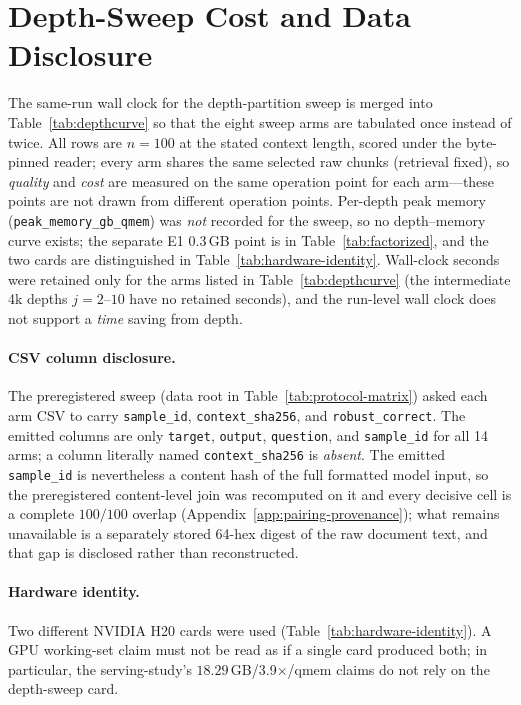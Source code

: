 \section{Depth-Sweep Cost and Data Disclosure}
\label{app:depthcurve-cost}

The same-run wall clock for the depth-partition sweep is merged into
Table~\ref{tab:depthcurve} so that the eight sweep arms are tabulated once
instead of twice.  All rows are $n=100$ at the stated context length, scored
under the byte-pinned reader; every arm shares the same selected raw chunks
(retrieval fixed), so \emph{quality} and \emph{cost} are measured on the same
operation point for each arm---these points are not drawn from different
operation points.  Per-depth peak memory (\texttt{peak\_memory\_gb\_qmem}) was
\emph{not} recorded for the sweep, so no depth--memory curve exists; the
separate E1 0.3\,GB point is in Table~\ref{tab:factorized}, and the two cards
are distinguished in Table~\ref{tab:hardware-identity}.  Wall-clock seconds were
retained only for the arms listed in Table~\ref{tab:depthcurve} (the
intermediate 4k depths $j{=}2$--$10$ have no retained seconds), and the
run-level wall clock does not support a \emph{time} saving from depth.

\FloatBarrier

\paragraph{CSV column disclosure.}
The preregistered sweep (data root in Table~\ref{tab:protocol-matrix}) asked
each arm CSV to carry
\texttt{sample\_id}, \texttt{context\_sha256}, and \texttt{robust\_correct}.
The emitted columns are only \texttt{target}, \texttt{output},
\texttt{question}, and \texttt{sample\_id} for all 14 arms; a column literally
named \texttt{context\_sha256} is \emph{absent}.  The emitted
\texttt{sample\_id} is nevertheless a content hash of the full formatted model
input, so the preregistered content-level join was recomputed on it and every
decisive cell is a complete $100/100$ overlap
(Appendix~\ref{app:pairing-provenance}); what remains unavailable is a
separately stored 64-hex digest of the raw document text, and that gap is
disclosed rather than reconstructed.

\FloatBarrier

\paragraph{Hardware identity.}
Two different NVIDIA H20 cards were used (Table~\ref{tab:hardware-identity}).
A GPU working-set claim must not be read as if a single card produced both;
in particular, the serving-study's $18.29$\,GB/3.9$\times$/qmem claims do not
rely on the depth-sweep card.

